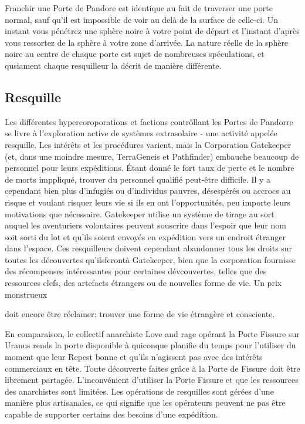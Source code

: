Franchir une Porte de Pandore est identique au fait de traverser une porte normal, sauf qu'il est impossible de voir au delà de la surface de celle-ci. Un instant vous pénétrez une sphère noire à votre point de départ et l'instant d'après vous ressortez de la sphère à votre zone d'arrivée. La nature réelle de la sphère noire au centre de chaque porte est sujet de nombreuses spéculations, et qusiament chaque resquilleur la décrit de manière différente. 

\subsection{Resquille} 

Les différentes hypercoroporations et factions contrôllant les Portes de Pandorre se livre à l'exploration active de systèmes extrasolaire - une activité appelée resquille. Les intérêts et les procédures varient, mais la Corporation Gatekeeper (et, dans une moindre mesure, TerraGeneis et Pathfinder) embauche beaucoup de personnel pour leurs expéditions. Étant donné le fort taux de perte et le nombre de morts imppliqué, trouver du personnel qualifié peut-être difficile. Il y a cependant bien plus d'infugiés ou d'individus pauvres, désespérés ou accrocs au risque et voulant risquer leurs vie si ils en ont l'opportunités, peu importe leurs motivations que nécessaire. Gatekeeper utilise un système de tirage au sort auquel les aventuriers volontaires peuvent souscrire dans l'espoir que leur nom soit sorti du lot et qu'ils soient envoyés en expédition vers un endroit étranger dans l'espace. Ces resquilleurs doivent cependant abandonner tous les droits sur toutes les découvertes qu'ilsferontà Gatekeeper, bien que la corporation fournisse des récompenses intéressantes pour certaines dévcouvertes, telles que des ressources clefs, des artefacts étrangers ou de nouvelles forme de vie. Un prix monstrueux 

doit encore être réclamer: trouver une forme de vie étrangère et consciente. 

En comparaison, le collectif anarchiste Love and rage opérant la Porte Fissure sur Uranus rends la porte disponible à quiconque planifie du temps pour l'utiliser du moment que leur Repest bonne et qu'ils n'agissent pas avec des intérêts commerciaux en tête. Toute découverte faites grâce à la Porte de Fissure doit être librement partagée. L'inconvénient d'utiliser la Porte Fissure et que les ressources des anarchistes sont limitées. Les opérations de resquilles sont gérées d'une manière plus artisanales, ce qui signifie que les opérateurs peuvent ne pas être capable de supporter certains des besoins d'une expédition. 

